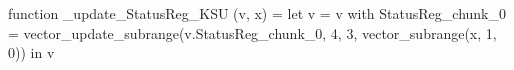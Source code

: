 function _update_StatusReg_KSU (v, x) = let v = { v with StatusReg_chunk_0 = vector_update_subrange(v.StatusReg_chunk_0, 4, 3, vector_subrange(x, 1, 0)) } in v
